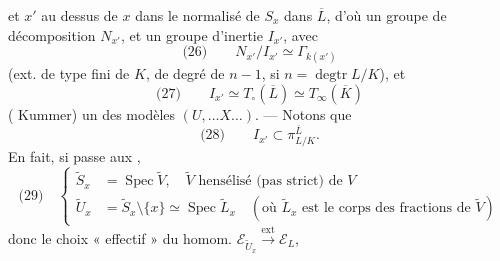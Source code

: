\documentclass[11pt,a4paper]{article}
\begin{document}
et  $x'$ au dessus de $x$ dans le
normalisé de $S_x$ dans $\overline{L}$, d'où un
groupe de décomposition $N_{x'}$, et un
groupe d'inertie $I_{x'}$, avec
\[
\text{(26)} \qquad N_{x'} / I_{x'} \simeq \Gamma_{k(x')}
\]
(ext. de type fini de $K$, de degré de  $n-1$, si $n = \operatorname{degtr} L/K$), et
\[
\text{(27)} \qquad I_{x'} \simeq T_{\circ}(\overline{L}) \simeq T_{\infty}(\overline{K})
\]
( Kummer)  
\ill{} un  des  \ill{}
 modèles $(U, \ldots X \ldots)$. --- Notons que
\[
\text{(28)} \qquad I_{x'} \subset \pi^{\overline{L}}_{L/K} .
\]
En fait, si  passe aux , 
\[
\text{(29)} \quad
\left\{
\begin{aligned}
\tilde{S}_x &= \operatorname{Spec} \tilde{V} , \quad \tilde{V} \text{ hensélisé (pas strict) de } V \\
\tilde{U}_x &= \tilde{S}_x \setminus \{x\} \simeq \operatorname{Spec} \tilde{L}_x \quad (\text{où } \tilde{L}_x \text{ est le corps des fractions de } \tilde{V})
\end{aligned}
\right.
\]
\struck{\ill{}} donc le choix « effectif »  du
homom. $\mathcal{E}_{\tilde{U}_x} \xrightarrow{\text{ext}} \mathcal{E}_L$,
\end{document}
